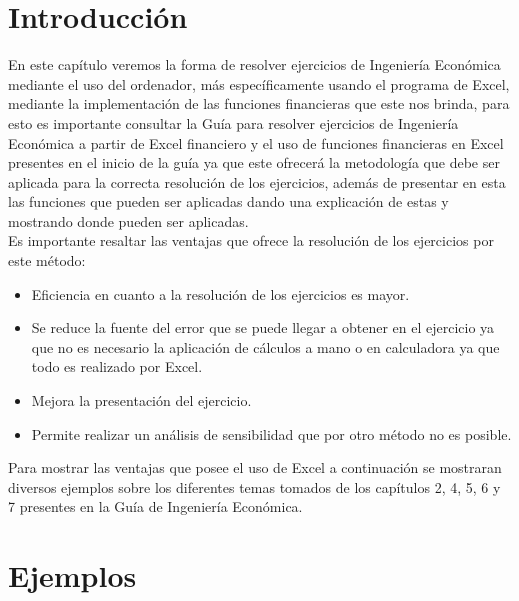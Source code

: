 \clearpage

\section{Introducción}

En este capítulo veremos la forma de resolver ejercicios de Ingeniería Económica mediante el uso del ordenador, más específicamente usando el programa de Excel, mediante la implementación de las funciones financieras que este nos brinda, para esto es importante consultar la Guía para resolver ejercicios de Ingeniería Económica a partir de Excel financiero y el uso de funciones financieras en Excel presentes en el inicio de la guía ya que este ofrecerá la metodología que debe ser aplicada para la correcta resolución de los ejercicios, además de presentar en esta las funciones que pueden ser aplicadas dando una explicación de estas y mostrando donde pueden ser aplicadas. 
\\

Es importante resaltar las ventajas que ofrece la resolución de los ejercicios por este método: \\

\begin{itemize}
\item Eficiencia en cuanto a la resolución de los ejercicios es mayor.\\
\item Se reduce la fuente del error que se puede llegar a obtener en el ejercicio ya que no es necesario la aplicación de cálculos a mano o en calculadora ya que todo es realizado por Excel.\\
\item Mejora la presentación del ejercicio.\\
\item Permite realizar un análisis de sensibilidad que por otro método no es posible.\\

\end{itemize}

Para mostrar las ventajas que posee el uso de Excel a continuación se mostraran diversos ejemplos sobre los diferentes temas tomados de los capítulos 2, 4, 5, 6 y 7 presentes en la Guía de Ingeniería Económica.

\section{Ejemplos}

